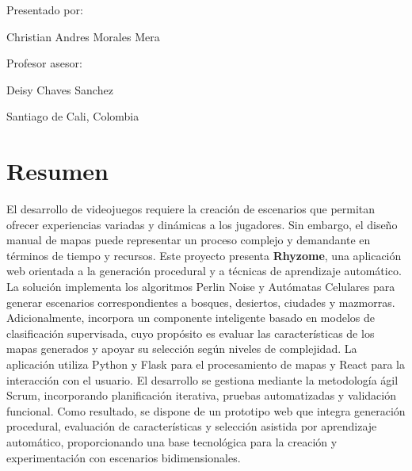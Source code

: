 \documentclass[12pt,oneside,openany]{report}
\begin{document}
\begin{titlepage}
    {
        \normalsize
        Presentado por:
        \par
    }

    {
        Christian Andres Morales Mera
        \par
    }

    \vspace{0.3cm}

    {
        \normalsize
        Profesor asesor:
        \par
    }

    {
        Deisy Chaves Sanchez
        \par
    }

    \vfill

    Santiago de Cali, Colombia
    \par

    \the\year

\end{titlepage}




\chapter*{Resumen}


{
    El desarrollo de videojuegos requiere la creación de escenarios que permitan ofrecer experiencias variadas y dinámicas a los jugadores. Sin embargo, el diseño manual de mapas puede representar un proceso complejo y demandante en términos  de tiempo y recursos. Este proyecto presenta \textbf{Rhyzome}, una aplicación web orientada a la generación procedural y a técnicas de aprendizaje automático. La solución implementa los algoritmos Perlin Noise y Autómatas Celulares para generar escenarios correspondientes a bosques, desiertos, ciudades y mazmorras. Adicionalmente, incorpora un componente inteligente basado en modelos de clasificación supervisada, cuyo propósito es evaluar las características de los mapas generados y apoyar su selección según niveles de complejidad. La aplicación utiliza Python y Flask para el procesamiento de mapas y React para la interacción con el usuario. El desarrollo se gestiona mediante la metodología ágil Scrum, incorporando  planificación iterativa, pruebas automatizadas y validación funcional. Como resultado, se dispone de un prototipo web que integra generación procedural, evaluación de características y selección asistida por aprendizaje automático, proporcionando una base tecnológica para la creación y experimentación con escenarios bidimensionales.
}
\end{document}
